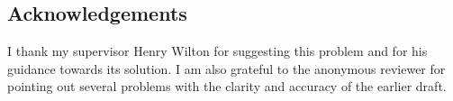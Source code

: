 \subsection*{Acknowledgements}

I thank my supervisor Henry Wilton for suggesting this problem and for his
guidance towards its solution.  I am also grateful to the anonymous reviewer
for pointing out several problems with the clarity and accuracy of the earlier
draft.


